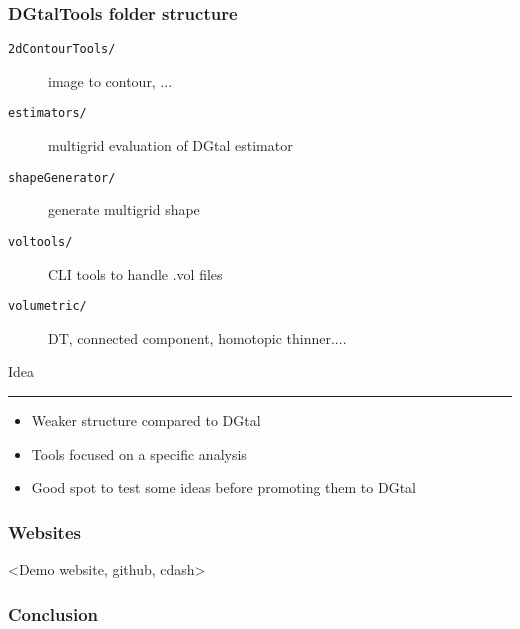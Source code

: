 \documentclass[8pt]{beamer}
\newcommand{\HH}{ \vspace{0.5pt}\hrule}
\begin{document}
\begin{frame}
  \frametitle{DGtalTools folder structure}

   \begin{description}
        \item[ \tt 2dContourTools/] image to contour, ...
        \item[ \tt estimators/] multigrid evaluation of  DGtal estimator
        \item[ \tt shapeGenerator/] generate multigrid shape
        \item[ \tt voltools/] CLI tools to handle .vol files
        \item[ \tt volumetric/] DT, connected component, homotopic thinner....
   \end{description}  

   \begin{block}{Idea\HH}
     \begin{itemize}
     \item Weaker  structure compared to DGtal
     \item Tools focused on a specific analysis
     \item Good spot to test some ideas before promoting them to DGtal
     \end{itemize}
     
   \end{block}

\end{frame}

\begin{frame}
  \frametitle{Websites}

<Demo website, github, cdash>
\end{frame}

\begin{frame}
  \frametitle{Conclusion}
\end{frame}
\end{document}
